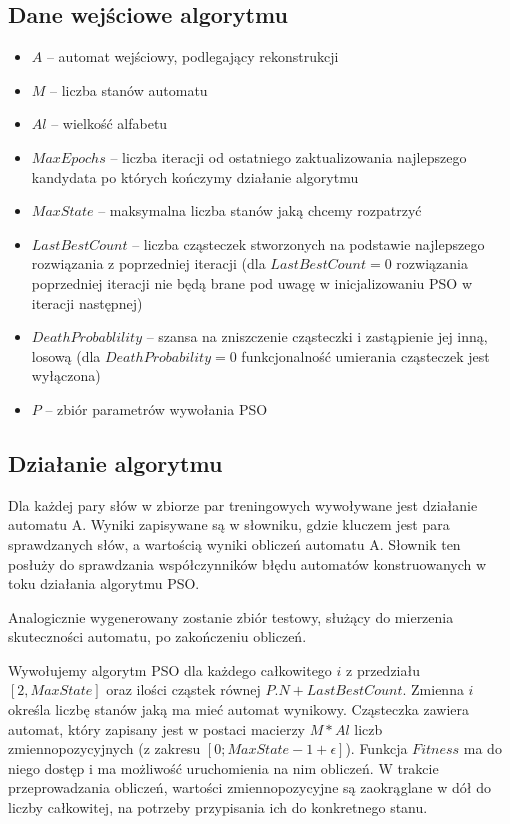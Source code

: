 \documentclass{../llncs_template_final/llncs}
\begin{document}
\subsection{Dane wejściowe algorytmu}
\begin{itemize}
\item $A$ -- automat wejściowy, podlegający rekonstrukcji
\item $M$ -- liczba stanów automatu
\item $Al$ -- wielkość alfabetu
\item $MaxEpochs$ -- liczba iteracji od ostatniego zaktualizowania najlepszego kandydata po których kończymy działanie algorytmu
\item $MaxState$ -- maksymalna liczba stanów jaką chcemy rozpatrzyć
\item $LastBestCount$ -- liczba cząsteczek stworzonych na podstawie najlepszego rozwiązania z poprzedniej iteracji (dla $LastBestCount = 0$ rozwiązania poprzedniej iteracji nie będą brane pod uwagę w inicjalizowaniu PSO w iteracji następnej)
\item $DeathProbablility$ -- szansa na zniszczenie cząsteczki i zastąpienie jej inną, losową (dla $DeathProbability = 0$ funkcjonalność umierania cząsteczek jest wyłączona)
\item $P$ -- zbiór parametrów wywołania PSO
\end{itemize}

\subsection{Działanie algorytmu}

Dla każdej pary słów w zbiorze par treningowych wywoływane jest działanie automatu A. Wyniki zapisywane są w słowniku, gdzie kluczem jest para sprawdzanych słów, a wartością wyniki obliczeń automatu A. Słownik ten posłuży do sprawdzania współczynników błędu automatów konstruowanych w toku działania algorytmu PSO.

Analogicznie wygenerowany zostanie zbiór testowy, służący do mierzenia skuteczności automatu, po zakończeniu obliczeń.

Wywołujemy algorytm PSO dla każdego całkowitego $i$ z przedziału $[2, MaxState]$ oraz ilości cząstek równej $P.N + LastBestCount$. Zmienna $i$ określa liczbę stanów jaką ma mieć automat wynikowy. Cząsteczka zawiera automat, który zapisany jest w postaci macierzy $M * Al$ liczb zmiennopozycyjnych (z zakresu $[0; MaxState - 1 + \epsilon]$). Funkcja $Fitness$ ma do niego dostęp i ma możliwość uruchomienia na nim obliczeń. W trakcie przeprowadzania obliczeń, wartości zmiennopozycyjne są zaokrąglane w dół do liczby całkowitej, na potrzeby przypisania ich do konkretnego stanu. 
\end{document}
